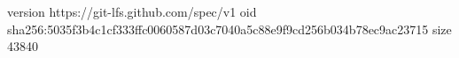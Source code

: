 version https://git-lfs.github.com/spec/v1
oid sha256:5035f3b4c1cf333ffc0060587d03c7040a5c88e9f9cd256b034b78ec9ac23715
size 43840
